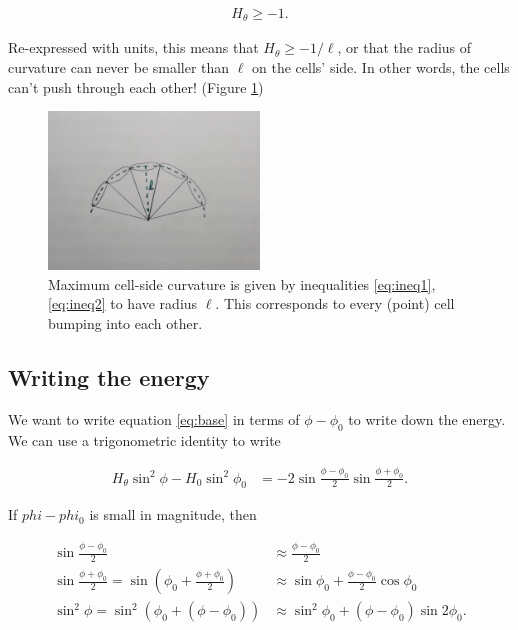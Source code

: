 \begin{align}
    H_\theta \geq -1. \label{eq:hlb}
\end{align}

\noindent Re-expressed with units, this means that $H_\theta \geq -1/\ell$, or that the radius of curvature can never be smaller than $\ell$ on the cells' side. In other words, the cells can't push through each other! (Figure \ref{fig:maxcurv})

\begin{figure}[hbtp]
    \centering
    \includegraphics[width=0.5\textwidth]{arc.jpg}
    \caption{Maximum cell-side curvature is given by inequalities \ref{eq:ineq1}, \ref{eq:ineq2} to have radius $\ell$. This corresponds to every (point) cell bumping into each other.}
    \label{fig:maxcurv}
\end{figure}

\subsection{Writing the energy}

We want to write equation \ref{eq:base} in terms of $\phi-\phi_0$ to write down the energy. We can use a trigonometric identity to write

\begin{align}
    H_\theta \sin^2\phi - H_0 \sin^2\phi_0 &= -2 \sin \frac{\phi - \phi_0}{2} \sin\frac{\phi + \phi_0}{2}. \label{eq:preapprox}
\end{align}

\noindent If $phi - phi_0$ is small in magnitude, then 

\begin{align*}
    \sin\frac{\phi - \phi_0}{2} &\approx \frac{\phi - \phi_0}{2} \\
    \sin\frac{\phi + \phi_0}{2} = \sin\left(\phi_0 + \frac{\phi + \phi_0}{2} \right) &\approx \sin\phi_0 + \frac{\phi - \phi_0}{2} \cos\phi_0 \\
    \sin^2\phi = \sin^2\left(\phi_0 + (\phi - \phi_0) \right) &\approx \sin^2\phi_0 +(\phi - \phi_0)\sin2\phi_0.
\end{align*}

